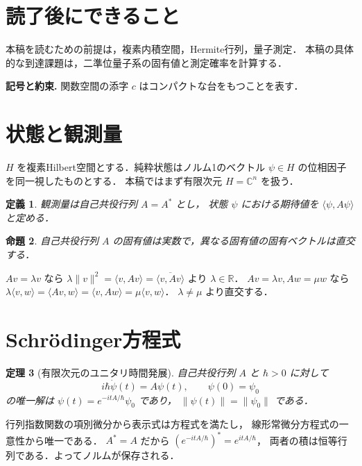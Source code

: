 \documentclass[a5paper,10pt,onecolumn]{jsarticle}
\makeatletter
\theoremstyle{mathnotetheorem}
\newtheorem{theorem}{定理}[section]
\newtheorem{definition}[theorem]{定義}
\newtheorem{proposition}[theorem]{命題}
\renewcommand{\proofname}{証明}
\renewenvironment{proof}[1][\proofname]{%
  \par\pushQED{\qed}\normalfont\topsep4\p@\@plus2\p@\relax
  \trivlist\item[\hskip\labelsep\bfseries #1]\ignorespaces
}{\popQED\endtrivlist\@endpefalse}
\newcommand{\norm}[1]{\lVert #1\rVert}
\makeatother
\begin{document}
\section*{読了後にできること}
本稿を読むための前提は，複素内積空間，Hermite行列，量子測定．
本稿の具体的な到達課題は，二準位量子系の固有値と測定確率を計算する．


\par\noindent\textbf{記号と約束.}\quad
関数空間の添字 $c$ はコンパクトな台をもつことを表す．
\par

\section{状態と観測量}
$H$ を複素Hilbert空間とする．純粋状態はノルム1のベクトル
$\psi\in H$ の位相因子を同一視したものとする．
本稿ではまず有限次元 $H=\mathbb C^n$ を扱う．
\begin{definition}
観測量は自己共役行列 $A=A^*$ とし，
状態 $\psi$ における期待値を $\langle\psi,A\psi\rangle$ と定める．
\end{definition}
\begin{proposition}
自己共役行列 $A$ の固有値は実数で，異なる固有値の固有ベクトルは直交する．
\end{proposition}
\begin{proof}
$Av=\lambda v$ なら
$\lambda\norm v^2=\langle v,Av\rangle=\overline{\langle v,Av\rangle}$
より $\lambda\in\mathbb R$．
$Av=\lambda v,Aw=\mu w$ なら
$\lambda\langle v,w\rangle=\langle Av,w\rangle
=\langle v,Aw\rangle=\mu\langle v,w\rangle$．
$\lambda\ne\mu$ より直交する．
\end{proof}
\section{Schr\"odinger方程式}
\begin{theorem}[有限次元のユニタリ時間発展]
自己共役行列 $A$ と $\hbar>0$ に対して
\[
 i\hbar\dot\psi(t)=A\psi(t),\qquad \psi(0)=\psi_0
\]
の唯一解は $\psi(t)=e^{-itA/\hbar}\psi_0$ であり，
$\norm{\psi(t)}=\norm{\psi_0}$ である．
\end{theorem}
\begin{proof}
行列指数関数の項別微分から表示式は方程式を満たし，
線形常微分方程式の一意性から唯一である．
$A^*=A$ だから
$(e^{-itA/\hbar})^*=e^{itA/\hbar}$，
両者の積は恒等行列である．よってノルムが保存される．
\end{proof}
\end{document}
